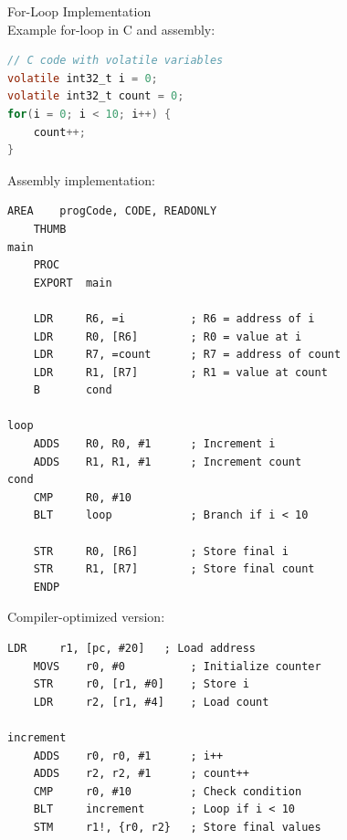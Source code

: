 \begin{example2}{For-Loop Implementation}\\
Example for-loop in C and assembly:

\begin{lstlisting}[language=C, style=basesmol]
// C code with volatile variables
volatile int32_t i = 0;
volatile int32_t count = 0;
for(i = 0; i < 10; i++) {
    count++;
}
\end{lstlisting}

Assembly implementation:
\begin{lstlisting}[language=armasm, style=basesmol]
    AREA    progCode, CODE, READONLY
    THUMB
main
    PROC
    EXPORT  main
    
    LDR     R6, =i          ; R6 = address of i
    LDR     R0, [R6]        ; R0 = value at i
    LDR     R7, =count      ; R7 = address of count
    LDR     R1, [R7]        ; R1 = value at count
    B       cond
    
loop
    ADDS    R0, R0, #1      ; Increment i
    ADDS    R1, R1, #1      ; Increment count
cond
    CMP     R0, #10
    BLT     loop            ; Branch if i < 10
    
    STR     R0, [R6]        ; Store final i
    STR     R1, [R7]        ; Store final count
    ENDP
\end{lstlisting}

Compiler-optimized version:
\begin{lstlisting}[language=armasm, style=basesmol]
    LDR     r1, [pc, #20]   ; Load address
    MOVS    r0, #0          ; Initialize counter
    STR     r0, [r1, #0]    ; Store i
    LDR     r2, [r1, #4]    ; Load count
    
increment
    ADDS    r0, r0, #1      ; i++
    ADDS    r2, r2, #1      ; count++
    CMP     r0, #10         ; Check condition
    BLT     increment       ; Loop if i < 10
    STM     r1!, {r0, r2}   ; Store final values
\end{lstlisting}
\end{example2}


